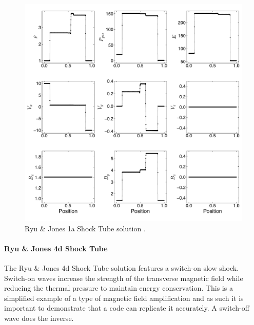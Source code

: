 \documentclass[modern, linenumbers]{aastex631}
\newcommand*{\img}[1]{%
    \raisebox{-.3\baselineskip}{%
        \texttt{[image: \#1]}%
    }%
}
\begin{document}
\begin{figure}[ht!]
    \includegraphics[width=\linewidth]{rj1a.pdf}
    \caption{Ryu \& Jones 1a Shock Tube solution \citep{ryu_jones_1995}.
    \href{https://github.com/bcaddy/caddy-et-al-2023/blob/4c9c5ef905902e54e50943d0a261bd5b08342225/python/shock-tubes.py}{\img{github.png}}}
    \label{fig:rj-1a}
\end{figure}

\paragraph{Ryu \& Jones 4d Shock Tube}

The Ryu \& Jones 4d Shock Tube solution \citep{ryu_jones_1995} features a switch-on slow shock. Switch-on waves increase the strength of the transverse magnetic field while reducing the thermal pressure to maintain energy conservation. This is a simplified example of a type of magnetic field amplification and as such it is important to demonstrate that a code can replicate it accurately. A switch-off wave does the inverse.
\end{document}
